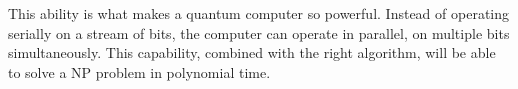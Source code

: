 \documentclass[10pt,journal,compsoc]{IEEEtran}
\begin{document}

This ability is what makes a quantum computer so powerful. Instead of operating serially on a stream of bits, the computer can operate in parallel, on multiple bits simultaneously. This capability, combined with the right algorithm, will be able to solve a NP problem in polynomial time. 

%
%



%
%
\end{document}
